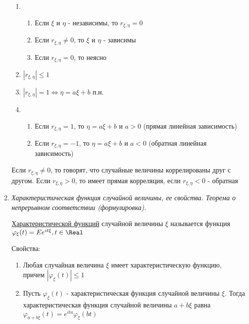 \begin{enumerate}
\begin{enumerate}
        \item \begin{enumerate}
            \item Если $\xi$ и $\eta$ - независимы, то $r_{\xi,\eta} = 0$

            \item Если $r_{\xi,\eta} \neq 0$, то $\xi$ и $\eta$ - зависимы

            \item Если $r_{\xi,\eta} = 0$, то неясно
        \end{enumerate}

        \item $|r_{\xi,\eta}| \leq 1$

        \item $|r_{\xi,\eta}| = 1 \Longleftrightarrow \eta = a \xi + b$ п.н.

        \item \begin{enumerate} 
            \item Если $r_{\xi,\eta} = 1$, то $\eta = a\xi + b$ и $a > 0$ (прямая линейная зависимость)

            \item Если $r_{\xi,\eta} = -1$, то $\eta = a\xi + b$ и $a < 0$ (обратная линейная зависимость)
        \end{enumerate}
    \end{enumerate}

    Если $r_{\xi,\eta} \neq 0$, то говорят, что случайные величины коррелированы друг с другом. Если $r_{\xi,\eta} > 0$, 
    то имеет прямая корреляция, если $r_{\xi,\eta} < 0$ - обратная

    \item \textit{Характеристическая функция случайной величины, ее свойства. Теорема о непрерывном соответствии (формулировка).}

    \hyperlink{characteristicfunction}{Характеристической функций} случайной величины $\xi$ называется функция $\varphi_\xi(t) = Ee^{it\xi}, t \in \Real$
    
    Свойства:

    \begin{enumerate}
        \item Любая случайная величина $\xi$ имеет характеристическую функцию, причем $|\varphi_\xi(t)| \leq 1$

        \item Пусть $\varphi_\xi(t)$ - характеристическая функция случайной величины $\xi$. Тогда характеристическая функция
        случайной величины $a + b\xi$ равна $\varphi_{a + b\xi}(t) = e^{ita} \varphi_{\xi}(bt)$


\end{enumerate}
\end{enumerate}
